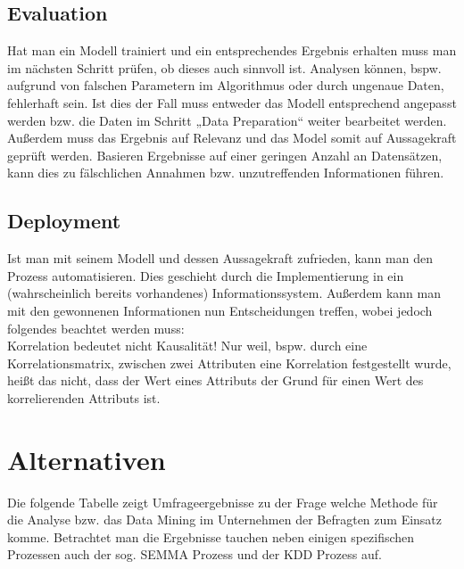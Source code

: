 \subsection{Evaluation}
\label{sec:process:crispdm:eval}

Hat man ein Modell trainiert und ein entsprechendes Ergebnis erhalten muss man
im nächsten Schritt prüfen, ob dieses auch sinnvoll ist. Analysen können, bspw.
aufgrund von falschen Parametern im Algorithmus oder durch ungenaue Daten,
fehlerhaft sein. Ist dies der Fall muss entweder das Modell entsprechend
angepasst werden bzw. die Daten im Schritt „Data Preparation“ weiter bearbeitet
werden. Außerdem muss das Ergebnis auf Relevanz und das Model somit auf
Aussagekraft geprüft werden. Basieren Ergebnisse auf einer geringen Anzahl an
Datensätzen, kann dies zu fälschlichen Annahmen bzw. unzutreffenden
Informationen führen.

\subsection{Deployment}
\label{sec:process:crispdm:depl}

Ist man mit seinem Modell und dessen Aussagekraft zufrieden, kann man den
Prozess automatisieren. Dies geschieht durch die Implementierung in ein
(wahrscheinlich bereits vorhandenes) Informationssystem. Außerdem kann man mit
den gewonnenen Informationen nun Entscheidungen treffen, wobei jedoch folgendes
beachtet werden muss: \\
Korrelation bedeutet nicht Kausalität! Nur weil, bspw. durch eine
Korrelationsmatrix, zwischen zwei Attributen eine Korrelation festgestellt
wurde, heißt das nicht, dass der Wert eines Attributs der Grund für einen Wert
des korrelierenden Attributs ist.

\section{Alternativen}
\label{sec:process:alt}

Die folgende Tabelle zeigt Umfrageergebnisse zu der Frage welche Methode für
die Analyse bzw. das Data Mining im Unternehmen der Befragten zum Einsatz komme.
Betrachtet man die Ergebnisse tauchen neben einigen spezifischen Prozessen auch
der sog. SEMMA Prozess und der KDD Prozess auf.

